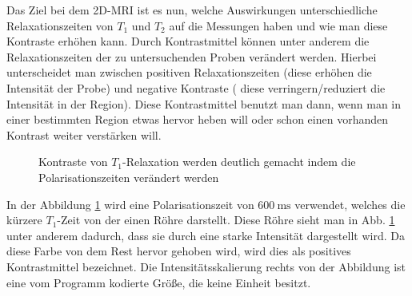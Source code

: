 Das Ziel bei dem 2D-MRI ist es nun, welche Auswirkungen unterschiedliche Relaxationszeiten von $T_1$ und $T_2$ auf die Messungen haben und wie man diese Kontraste erhöhen kann. Durch Kontrastmittel können unter anderem die Relaxationszeiten der zu untersuchenden Proben verändert werden. Hierbei unterscheidet man zwischen positiven Relaxationszeiten (diese erhöhen die Intensität der Probe) und negative Kontraste ( diese verringern/reduziert die Intensität in der Region).  Diese Kontrastmittel benutzt man dann, wenn man in einer bestimmten Region etwas hervor heben will oder schon einen vorhanden Kontrast weiter verstärken will.   
\begin{figure}[H]
\centering
{}
{}
{}
{}
\caption{Kontraste von $T_1$-Relaxation werden deutlich gemacht indem die Polarisationszeiten verändert werden}\label{fig:11600}
\end{figure}
In der Abbildung \ref{fig:11600} wird eine Polarisationszeit von $\SI{600}{\milli\second}$ verwendet,
 welches die kürzere $T_1$-Zeit von der einen Röhre darstellt. Diese Röhre sieht man in Abb. \ref{fig:11600} unter anderem dadurch,
dass sie durch eine starke Intensität dargestellt wird. Da diese Farbe von dem Rest hervor gehoben wird, wird dies als positives Kontrastmittel bezeichnet.
Die Intensitätsskalierung rechts von der Abbildung ist eine vom Programm kodierte Größe, die keine Einheit besitzt.\\

